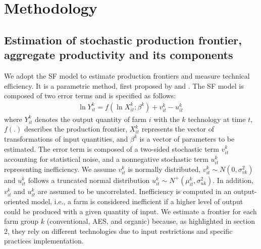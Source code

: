 \begin{Article}
\begin{refsection}[Lassalas]
\begin{center}
\end{center}



\section{Methodology}

  \subsection{Estimation of stochastic production frontier, aggregate
    productivity and its components}

We adopt the SF model to estimate production frontiers and measure
technical efficiency. It is a parametric method, first proposed by
\textcite{aigner1977} and \textcite{meeusen_van_den_broeck_1977}. The SF model is composed of two error terms and is specified
as follows:
\begin{align}
\ln Y_{it}^{k} = f\left( \ln X_{it}^{k};\beta^{k} \right) + v_{it}^{k} - u_{it}^{k}\
\end{align}
where \(Y_{it}^{k}\) denotes the output quantity of farm
\(i\) with the \(k\) technology at time \(t\), \(f(.)\) describes the
production frontier, \(X_{it}^{k}\) represents the vector of
transformations of input quantities, and \(\beta^{k}\) is a vector of
parameters to be estimated. The error term is composed of a two-sided
stochastic term \(v_{it}^{k}\) accounting for statistical noise, and a
nonnegative stochastic term \(u_{it}^{k}\) representing inefficiency. We
assume \(v_{it}^{k}\) is normally distributed,
\(v_{it}^{k}\sim N(0,\sigma_{vk}^{2})\) and \(u_{it}^{k}\) follows a
truncated normal
distribution \(u_{it}^{k}\sim N^{+}(\mu_{it}^{k},\sigma_{uk}^{2})\).
In addition, \(v_{it}^{k}\) and \(u_{it}^{k}\) are assumed to be
uncorrelated. Inefficiency is computed in an output-oriented model,
i.e., a farm is considered inefficient if a higher level of output could
be produced with a given quantity of input. We estimate a frontier for
each farm group \(k\) (conventional, AES, and organic) because, as
highlighted in section 2, they rely on different technologies due to
input restrictions and specific practices implementation.


\end{refsection}
\end{Article}
